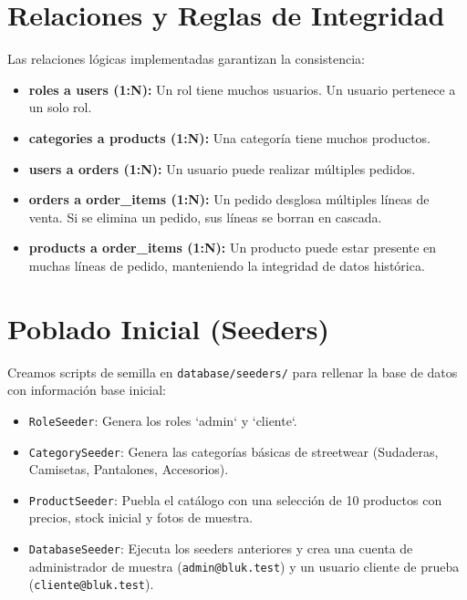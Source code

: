 \section{Relaciones y Reglas de Integridad}
Las relaciones lógicas implementadas garantizan la consistencia:
\begin{itemize}
    \item \textbf{roles a users (1:N):} Un rol tiene muchos usuarios. Un usuario pertenece a un solo rol.
    \item \textbf{categories a products (1:N):} Una categoría tiene muchos productos.
    \item \textbf{users a orders (1:N):} Un usuario puede realizar múltiples pedidos.
    \item \textbf{orders a order\_items (1:N):} Un pedido desglosa múltiples líneas de venta. Si se elimina un pedido, sus líneas se borran en cascada.
    \item \textbf{products a order\_items (1:N):} Un producto puede estar presente en muchas líneas de pedido, manteniendo la integridad de datos histórica.
\end{itemize}
    
\section{Poblado Inicial (Seeders)}
Creamos scripts de semilla en \texttt{database/seeders/} para rellenar la base de datos con información base inicial:
\begin{itemize}
    \item \texttt{RoleSeeder}: Genera los roles `admin` y `cliente`.
    \item \texttt{CategorySeeder}: Genera las categorías básicas de streetwear (Sudaderas, Camisetas, Pantalones, Accesorios).
    \item \texttt{ProductSeeder}: Puebla el catálogo con una selección de 10 productos con precios, stock inicial y fotos de muestra.
    \item \texttt{DatabaseSeeder}: Ejecuta los seeders anteriores y crea una cuenta de administrador de muestra (\texttt{admin@bluk.test}) y un usuario cliente de prueba (\texttt{cliente@bluk.test}).
\end{itemize}
